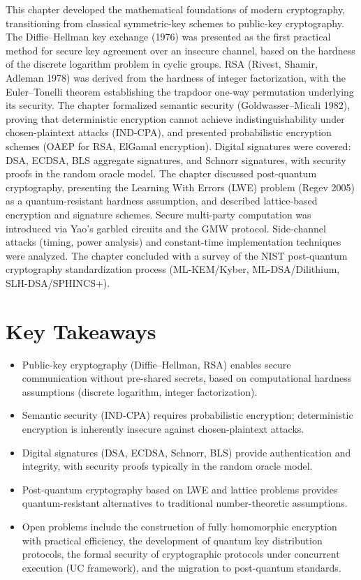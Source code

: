 This chapter developed the mathematical foundations of modern cryptography, transitioning from classical symmetric-key schemes to public-key cryptography. The Diffie--Hellman key exchange (1976) was presented as the first practical method for secure key agreement over an insecure channel, based on the hardness of the discrete logarithm problem in cyclic groups. RSA (Rivest, Shamir, Adleman 1978) was derived from the hardness of integer factorization, with the Euler--Tonelli theorem establishing the trapdoor one-way permutation underlying its security. The chapter formalized semantic security (Goldwasser--Micali 1982), proving that deterministic encryption cannot achieve indistinguishability under chosen-plaintext attacks (IND-CPA), and presented probabilistic encryption schemes (OAEP for RSA, ElGamal encryption). Digital signatures were covered: DSA, ECDSA, BLS aggregate signatures, and Schnorr signatures, with security proofs in the random oracle model. The chapter discussed post-quantum cryptography, presenting the Learning With Errors (LWE) problem (Regev 2005) as a quantum-resistant hardness assumption, and described lattice-based encryption and signature schemes. Secure multi-party computation was introduced via Yao's garbled circuits and the GMW protocol. Side-channel attacks (timing, power analysis) and constant-time implementation techniques were analyzed. The chapter concluded with a survey of the NIST post-quantum cryptography standardization process (ML-KEM/Kyber, ML-DSA/Dilithium, SLH-DSA/SPHINCS+).

\section*{Key Takeaways}
\begin{itemize}
\item Public-key cryptography (Diffie--Hellman, RSA) enables secure communication without pre-shared secrets, based on computational hardness assumptions (discrete logarithm, integer factorization).
\item Semantic security (IND-CPA) requires probabilistic encryption; deterministic encryption is inherently insecure against chosen-plaintext attacks.
\item Digital signatures (DSA, ECDSA, Schnorr, BLS) provide authentication and integrity, with security proofs typically in the random oracle model.
\item Post-quantum cryptography based on LWE and lattice problems provides quantum-resistant alternatives to traditional number-theoretic assumptions.
\item Open problems include the construction of fully homomorphic encryption with practical efficiency, the development of quantum key distribution protocols, the formal security of cryptographic protocols under concurrent execution (UC framework), and the migration to post-quantum standards.
\end{itemize}

